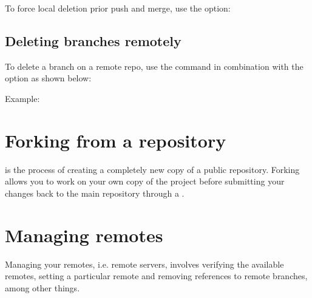 \documentclass[a4paper,10pt,english,openany,oneside]{sphinxmanual}
\begin{document}
\sphinxAtStartPar
To force local deletion  prior push and merge, use the  option:

\begin{sphinxVerbatim}[commandchars=\\\{\}]
   
\end{sphinxVerbatim}


\subsection{Deleting branches remotely}
\label{\detokenize{gitinminutes:deleting-branches-remotely}}
\sphinxAtStartPar
To delete a branch on a remote repo, use the  command in combination with the  option as shown below:

\begin{sphinxVerbatim}[commandchars=\\\{\}]
    
\end{sphinxVerbatim}

\sphinxAtStartPar
Example:

\begin{sphinxVerbatim}[commandchars=\\\{\}]
    
\end{sphinxVerbatim}


\section{Forking from a repository}
\label{\detokenize{gitinminutes:forking-from-a-repository}}
\sphinxAtStartPar
{} is the process of creating a completely new copy of a public repository. Forking allows you to work on your own copy of the project before submitting your changes back to the main repository through a .


\section{Managing remotes}
\label{\detokenize{gitinminutes:managing-remotes}}
\sphinxAtStartPar
Managing your remotes, i.e. remote servers, involves verifying the available remotes, setting a particular remote and removing references to remote branches, among other things.
\end{document}
